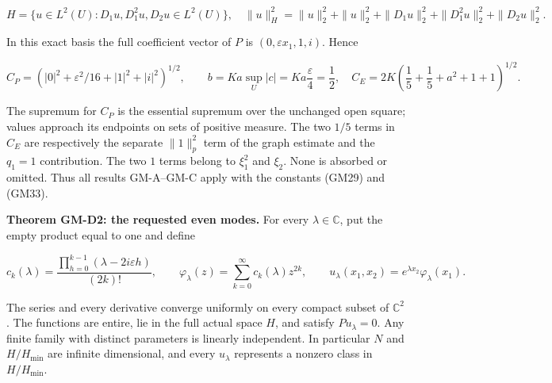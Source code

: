 \documentclass[
  11pt,
]{article}
\begin{document}
\[
 H=\{u\in L^2(U):D_1u,D_1^2u,D_2u\in L^2(U)\},
 \quad
 \|u\|_H^2=\|u\|_2^2+\|u\|_2^2
                    +\|D_1u\|_2^2+\|D_1^2u\|_2^2+\|D_2u\|_2^2.
 \tag{GM32}
\]

In this exact basis the full coefficient vector of
\(P\) is \((0,\varepsilon x_1,1,i)\). Hence

\[
 C_P=\left(|0|^2+\varepsilon^2/16+|1|^2+|i|^2\right)^{1/2},
 \qquad
 b=Ka\sup_U|c|=Ka\frac{\varepsilon}{4}=\frac12,
 \quad
 C_E=2K\left(\frac15+\frac15+a^2+1+1\right)^{1/2}.
 \tag{GM33}
\]

The supremum for \(C_P\) is the essential supremum
over the unchanged open square; values approach its endpoints on sets of
positive measure. The two \(1/5\) terms in
\(C_E\) are respectively the separate
\(\|1\|_p^2\) term of the graph estimate and the
\(q_1=1\) contribution. The two
\(1\) terms belong to \(\xi_1^2\)
and \(\xi_2\). None is absorbed or omitted. Thus all
results GM-A--GM-C apply with the constants (GM29) and (GM33).

\textbf{Theorem GM-D2: the requested even modes.} For every
\(\lambda\in\mathbb C\), put the empty product equal to one and
define

\[
 c_k(\lambda)=\frac{\prod_{h=0}^{k-1}(\lambda-2i\varepsilon h)}{(2k)!},
 \qquad
 \varphi_\lambda(z)=\sum_{k=0}^\infty c_k(\lambda)z^{2k},
 \qquad
 u_\lambda(x_1,x_2)=e^{\lambda x_2}\varphi_\lambda(x_1).
 \tag{GM34}
\]

The series and every derivative converge uniformly on every compact
subset of \(\mathbb C^2\). The functions are entire, lie in
the full actual space \(H\), and satisfy
\(Pu_\lambda=0\). Any finite family with distinct parameters
is linearly independent. In particular \(N\) and
\(H/H_{\min}\) are infinite dimensional, and every
\(u_\lambda\) represents a nonzero class in
\(H/H_{\min}\).
\end{document}
